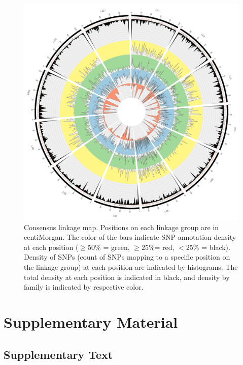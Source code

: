 \documentclass[11pt]{article}
\newcommand{\beginsupplement}{%
        \setcounter{table}{0}
        \renewcommand{\thetable}{S\arabic{table}}
        \setcounter{figure}{0}
        \renewcommand{\thefigure}{S\arabic{figure}}
        \renewcommand{\thesection}{S\arabic{section}}
        \renewcommand{\thesubsection}{S\arabic{subsection}}
     }
\begin{document}
\begin{figure}[ht]
  \centering
  \includegraphics[width=\textwidth]{circos_con}
  \caption{Consensus linkage map.  Positions on each linkage group are in centiMorgan. The color of the bars indicate SNP
annotation density at each position ($\ge 50\%$ = green, $\ge 25\%$= red, $< 25\%$ = black). Density of SNPs (count of SNPs mapping 
to a specific position on the linkage group) at each position are indicated by histograms. The total density at each position is indicated 
in black, and density by family is indicated by respective color.}
  \label{f:con}
\end{figure}

\clearpage

\beginsupplement

\section*{Supplementary Material}

\subsection*{Supplementary Text}\label{ss:supp}
\end{document}
